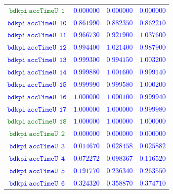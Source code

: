 \documentclass[10pt,a4paper]{article}
\begin{document}
\begin{table}[h!]
{\begin{tabular}{cccc}
\textcolor{Green}{$\mathtt{bdkpi~accTimeU~~1}$} & \textcolor{blue}{$0.000000$}& \textcolor{blue}{$0.000000$}& \textcolor{blue}{$0.000000$}\\
\textcolor{blue}{$\mathtt{bdkpi~accTimeU~~10}$} & \textcolor{blue}{$0.861990$}& \textcolor{blue}{$0.882350$}& \textcolor{blue}{$0.862210$}\\
\textcolor{blue}{$\mathtt{bdkpi~accTimeU~~11}$} & \textcolor{blue}{$0.966730$}& \textcolor{blue}{$0.921900$}& \textcolor{blue}{$1.037600$}\\
\textcolor{blue}{$\mathtt{bdkpi~accTimeU~~12}$} & \textcolor{blue}{$0.994400$}& \textcolor{blue}{$1.021400$}& \textcolor{blue}{$0.987900$}\\
\textcolor{blue}{$\mathtt{bdkpi~accTimeU~~13}$} & \textcolor{blue}{$0.999300$}& \textcolor{blue}{$0.994150$}& \textcolor{blue}{$1.003200$}\\
\textcolor{blue}{$\mathtt{bdkpi~accTimeU~~14}$} & \textcolor{blue}{$0.999880$}& \textcolor{blue}{$1.001600$}& \textcolor{blue}{$0.999140$}\\
\textcolor{blue}{$\mathtt{bdkpi~accTimeU~~15}$} & \textcolor{blue}{$0.999990$}& \textcolor{blue}{$0.999580$}& \textcolor{blue}{$1.000200$}\\
\textcolor{blue}{$\mathtt{bdkpi~accTimeU~~16}$} & \textcolor{blue}{$1.000000$}& \textcolor{blue}{$1.000100$}& \textcolor{blue}{$0.999940$}\\
\textcolor{blue}{$\mathtt{bdkpi~accTimeU~~17}$} & \textcolor{blue}{$1.000000$}& \textcolor{blue}{$1.000000$}& \textcolor{blue}{$0.999980$}\\
\textcolor{Green}{$\mathtt{bdkpi~accTimeU~~18}$} & \textcolor{blue}{$1.000000$}& \textcolor{blue}{$1.000000$}& \textcolor{blue}{$1.000000$}\\
\textcolor{Green}{$\mathtt{bdkpi~accTimeU~~2}$} & \textcolor{blue}{$0.000000$}& \textcolor{blue}{$0.000000$}& \textcolor{blue}{$0.000000$}\\
\textcolor{blue}{$\mathtt{bdkpi~accTimeU~~3}$} & \textcolor{blue}{$0.014670$}& \textcolor{blue}{$0.028458$}& \textcolor{blue}{$0.025882$}\\
\textcolor{blue}{$\mathtt{bdkpi~accTimeU~~4}$} & \textcolor{blue}{$0.072272$}& \textcolor{blue}{$0.098367$}& \textcolor{blue}{$0.116520$}\\
\textcolor{blue}{$\mathtt{bdkpi~accTimeU~~5}$} & \textcolor{blue}{$0.191770$}& \textcolor{blue}{$0.236340$}& \textcolor{blue}{$0.263550$}\\
\textcolor{blue}{$\mathtt{bdkpi~accTimeU~~6}$} & \textcolor{blue}{$0.324320$}& \textcolor{blue}{$0.358870$}& \textcolor{blue}{$0.374710$}\\

\end{tabular}}
\end{table}
\end{document}
